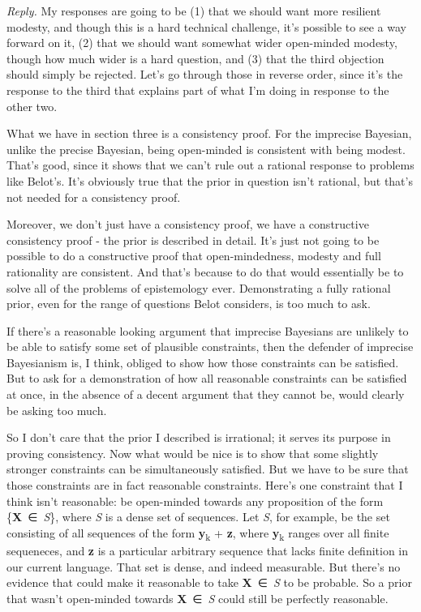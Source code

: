 \documentclass[
  11pt,
  letterpaper,
  DIV=11,
  numbers=noendperiod,
  twoside]{scrartcl}
\begin{document}
\emph{Reply.} My responses are going to be (1) that we should want more
resilient modesty, and though this is a hard technical challenge, it's
possible to see a way forward on it, (2) that we should want somewhat
wider open-minded modesty, though how much wider is a hard question, and
(3) that the third objection should simply be rejected. Let's go through
those in reverse order, since it's the response to the third that
explains part of what I'm doing in response to the other two.

What we have in section three is a consistency proof. For the imprecise
Bayesian, unlike the precise Bayesian, being open-minded is consistent
with being modest. That's good, since it shows that we can't rule out a
rational response to problems like Belot's. It's obviously true that the
prior in question isn't rational, but that's not needed for a
consistency proof.

Moreover, we don't just have a consistency proof, we have a constructive
consistency proof - the prior is described in detail. It's just not
going to be possible to do a constructive proof that open-mindedness,
modesty and full rationality are consistent. And that's because to do
that would essentially be to solve all of the problems of epistemology
ever. Demonstrating a fully rational prior, even for the range of
questions Belot considers, is too much to ask.

If there's a reasonable looking argument that imprecise Bayesians are
unlikely to be able to satisfy some set of plausible constraints, then
the defender of imprecise Bayesianism is, I think, obliged to show how
those constraints can be satisfied. But to ask for a demonstration of
how all reasonable constraints can be satisfied at once, in the absence
of a decent argument that they cannot be, would clearly be asking too
much.

So I don't care that the prior I described is irrational; it serves its
purpose in proving consistency. Now what would be nice is to show that
some slightly stronger constraints can be simultaneously satisfied. But
we have to be sure that those constraints are in fact reasonable
constraints. Here's one constraint that I think isn't reasonable: be
open-minded towards any proposition of the form
\{\textbf{X}~∈~\emph{S}\}, where \emph{S} is a dense set of sequences.
Let \emph{S}, for example, be the set consisting of all sequences of the
form \textbf{y}\textsubscript{k} + \textbf{z}, where
\textbf{y}\textsubscript{k} ranges over all finite sequeneces, and
\textbf{z} is a particular arbitrary sequence that lacks finite
definition in our current language. That set is dense, and indeed
measurable. But there's no evidence that could make it reasonable to
take \textbf{X}~∈~\emph{S} to be probable. So a prior that wasn't
open-minded towards \textbf{X}~∈~\emph{S} could still be perfectly
reasonable.
\end{document}
